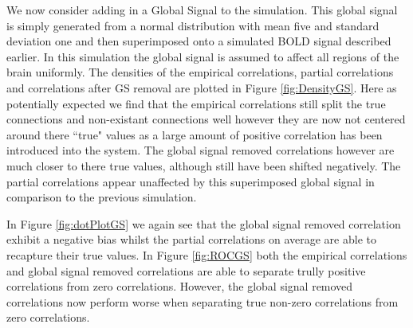 \documentclass[a4paper]{article}\usepackage[]{graphicx}\usepackage[]{color}
\begin{document}
We now consider adding in a Global Signal to the simulation. This global signal is simply generated from a normal distribution with mean five and standard deviation one and then superimposed onto a simulated BOLD signal described earlier. In this simulation the global signal is assumed to affect all regions of the brain uniformly. The densities of the empirical correlations, partial correlations and correlations after GS removal are plotted in Figure \ref{fig:DensityGS}. Here as potentially expected we find that the empirical correlations still split the true connections and non-existant connections well however they are now not centered around there ``true" values as a large amount of positive correlation has been introduced into the system. The global signal removed correlations however are much closer to there true values, although still have been shifted negatively. The partial correlations appear unaffected by this superimposed global signal in comparison to the previous simulation.

In Figure \ref{fig:dotPlotGS} we again see that the global signal removed correlation exhibit a negative bias whilst the partial correlations on average are able to recapture their true values. In Figure \ref{fig:ROCGS} both the empirical correlations and global signal removed correlations are able to separate trully positive correlations from zero correlations. However, the global signal removed correlations now perform worse when separating true non-zero correlations from zero correlations.
\end{document}
